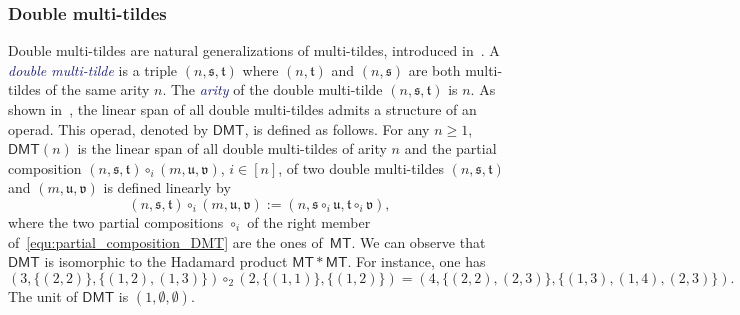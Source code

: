 \documentclass[10pt,reqno]{amsart}
\numberwithin{equation}{subsection}
\renewcommand{\geq}{\geqslant}
\newcommand{\Tfr}{\mathfrak{t}}
\newcommand{\Sfr}{\mathfrak{s}}
\newcommand{\Ufr}{\mathfrak{u}}
\newcommand{\Vfr}{\mathfrak{v}}
\newcommand{\MT}{\mathsf{MT}}
\newcommand{\DMT}{\mathsf{DMT}}
\newcommand{\Def}[1]{\textcolor{MidnightBlue}{\em #1}}
\begin{document}
\subsubsection{Double multi-tildes}
Double multi-tildes are natural generalizations of multi-tildes,
introduced in~\cite{GLMN16}. A \Def{double multi-tilde} is a triple
$(n, \Sfr, \Tfr)$ where $(n, \Tfr)$ and $(n, \Sfr)$ are both multi-tildes
of the same arity $n$. The \Def{arity} of the double multi-tilde
$(n, \Sfr, \Tfr)$ is $n$. As shown in~\cite{GLMN16}, the linear span of
all double multi-tildes admits a structure of an operad. This operad,
denoted by $\DMT$, is defined as follows. For any $n \geq 1$, $\DMT(n)$
is the linear span of all double multi-tildes of arity $n$ and the
partial composition $(n, \Sfr, \Tfr) \circ_i (m, \Ufr, \Vfr)$,
$i \in [n]$, of two double multi-tildes $(n, \Sfr, \Tfr)$ and
$(m, \Ufr, \Vfr)$ is defined linearly by
\begin{equation} \label{equ:partial_composition_DMT}
    (n, \Sfr, \Tfr) \circ_i (m, \Ufr, \Vfr) :=
    (n, \Sfr \circ_i \Ufr, \Tfr \circ_i \Vfr),
\end{equation}
where the two partial compositions $\circ_i$ of the right member
of~\eqref{equ:partial_composition_DMT} are the ones of~$\MT$. We can
observe that $\DMT$ is isomorphic to the Hadamard product $\MT * \MT$.
For instance, one has
\begin{equation} \label{equ:example_composition_DMT}
    (3, \{(2, 2)\}, \{(1, 2), (1, 3)\})
    \circ_2
    (2, \{(1, 1)\}, \{(1, 2)\})
    =
    (4, \{(2, 2), (2, 3)\}, \{(1, 3), (1, 4), (2, 3)\}).
\end{equation}
The unit of $\DMT$ is $(1, \emptyset, \emptyset)$.
\medskip
\end{document}
